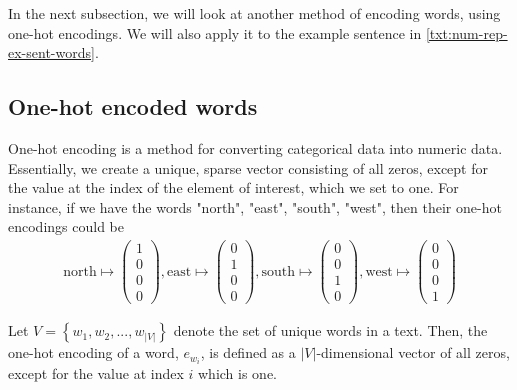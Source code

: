 \noindent
In the next subsection, we will look at another method of encoding words, using one-hot encodings. We will also apply it to the example sentence in \ref{txt:num-rep-ex-sent-words}.

\subsection{One-hot encoded words}
One-hot encoding is a method for converting categorical data into numeric data. Essentially, we create a unique, sparse vector consisting of all zeros, except for the value at the index of the element of interest, which we set to one. For instance, if we have the words "north", "east", "south", "west", then their one-hot encodings could be
\begin{align}
    \text{north} \mapsto \begin{pmatrix}
    1\\
    0\\
    0\\
    0
    \end{pmatrix},
    \text{east} \mapsto \begin{pmatrix}
    0\\
    1\\
    0\\
    0
    \end{pmatrix},
    \text{south} \mapsto \begin{pmatrix}
    0\\
    0\\
    1\\
    0
    \end{pmatrix},
    \text{west} \mapsto \begin{pmatrix}
    0\\
    0\\
    0\\
    1
    \end{pmatrix}
\end{align}

\begin{definition}
Let $V = \left \{ w_1, w_2, ..., w_{|V|} \right \}$ denote the set of unique words in a text. Then, the one-hot encoding of a word, $e_{w_i}$, is defined as a $|V|$-dimensional vector of all zeros, except for the value at index $i$ which is one. \label{def:one-hot-encoding}
\end{definition}

